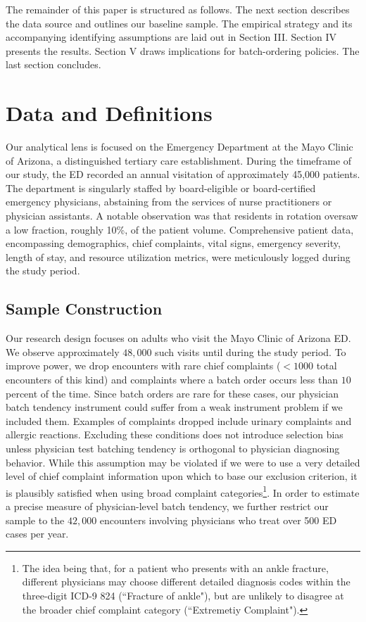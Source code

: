 \documentclass[,,nonblindrev]{informs}
\begin{document}
The remainder of this paper is structured as follows. The next section
describes the data source and outlines our baseline sample. The
empirical strategy and its accompanying identifying assumptions are laid
out in Section III. Section IV presents the results. Section V draws
implications for batch-ordering policies. The last section concludes.

\hypertarget{sec:II}{%
\section{Data and Definitions}\label{sec:II}}

Our analytical lens is focused on the Emergency Department at the Mayo
Clinic of Arizona, a distinguished tertiary care establishment. During
the timeframe of our study, the ED recorded an annual visitation of
approximately 45,000 patients. The department is singularly staffed by
board-eligible or board-certified emergency physicians, abstaining from
the services of nurse practitioners or physician assistants. A notable
observation was that residents in rotation oversaw a low fraction,
roughly 10\%, of the patient volume. Comprehensive patient data,
encompassing demographics, chief complaints, vital signs, emergency
severity, length of stay, and resource utilization metrics, were
meticulously logged during the study period.

\hypertarget{sample-construction}{%
\subsection{Sample Construction}\label{sample-construction}}

Our research design focuses on adults who visit the Mayo Clinic of
Arizona ED. We observe approximately \(48,000\) such visits until during
the study period. To improve power, we drop encounters with rare chief
complaints (\(<1000\) total encounters of this kind) and complaints
where a batch order occurs less than \(10\) percent of the time. Since
batch orders are rare for these cases, our physician batch tendency
instrument could suffer from a weak instrument problem if we included
them. Examples of complaints dropped include urinary complaints and
allergic reactions. Excluding these conditions does not introduce
selection bias unless physician test batching tendency is orthogonal to
physician diagnosing behavior. While this assumption may be violated if
we were to use a very detailed level of chief complaint information upon
which to base our exclusion criterion, it is plausibly satisfied when
using broad complaint
categories\footnote{The idea being that, for a patient who presents with an ankle fracture, different physicians may choose different detailed diagnosis codes within the three-digit ICD-9 824 (``Fracture of ankle"), but are unlikely to disagree at the broader chief complaint category (``Extremetiy Complaint").}.
In order to estimate a precise measure of physician-level batch
tendency, we further restrict our sample to the \(42,000\) encounters
involving physicians who treat over 500 ED cases per year.
\end{document}
